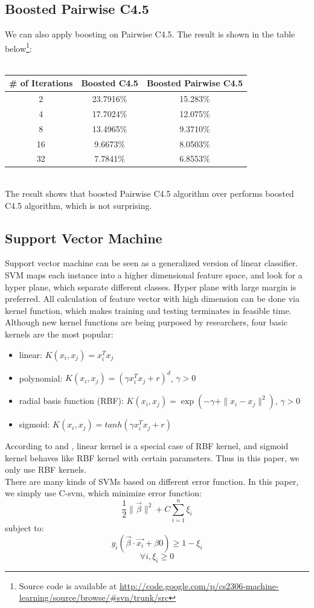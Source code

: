 \documentclass[a4paper,11pt]{article}
\begin{document}
\subsection{Boosted Pairwise C4.5}
We can also apply boosting on Pairwise C4.5. The result is shown in the table below\footnote{Source code is available at \url{http://code.google.com/p/cs2306-machine-learning/source/browse/#svn/trunk/src}}:\\
\vspace{0.5cm}\\
\begin{tabular}{c c c}
\# of Iterations	& Boosted C4.5 & Boosted Pairwise C4.5\\
\hline \hline
	2		& 23.7916\% & 15.283\%  \\
	4		& 17.7024\% & 12.075\%  \\
	8		& 13.4965\% & 9.3710\%  \\
	16		& 9.6673\%  & 8.0503\%  \\
    32      & 7.7841\%  & 6.8553\%\\
\end{tabular}
\vspace{0.5cm}\\
The result shows that boosted Pairwise C4.5 algorithm over performs boosted C4.5 algorithm, which is not surprising.\\

\subsection{Support Vector Machine}
Support vector machine can be seen as a generalized version of linear classifier. SVM maps each instance into a higher dimensional feature space, and look for a hyper plane, which separate different classes. Hyper plane with large margin is preferred. All calculation of feature vector with high dimension can be done via kernel function, which makes training and testing terminates in feasible time. Although new kernel functions are being purposed by researchers, four basic kernels are the most popular\cite{svm}:
\begin{itemize}
\item linear: $K(x_i,x_j)=x_i^Tx_j$\\
\item polynomial: $K(x_i,x_j)=(\gamma x_i^Tx_j+r)^d$, $\gamma >0$\\
\item radial basis function (RBF): $K(x_i,x_j)=\exp(-\gamma + \|x_i-x_j\|^2)$, $\gamma > 0$\\
\item sigmoid: $K(x_i,x_j)=tanh(\gamma x_i^Tx_j+r)$\\
\end{itemize}
According to \cite{SSK} and \cite{LL}, linear kernel is a special case of RBF kernel, and sigmoid kernel behaves like RBF kernel with certain parameters. Thus in this paper, we only use RBF kernels.\\
There are many kinds of SVMs based on different error function. In this paper, we simply use C-svm, which minimize error function:
    $$\frac{1}{2}\|\vec{\beta}\|^2+C\sum_{i=1}^n \xi_i$$
 subject to:$$y_i(\vec{\beta}\cdot \vec{x_i}+\beta{0})\geq 1-\xi_i$$$$\forall i, \xi_i\geq 0$$
\end{document}
